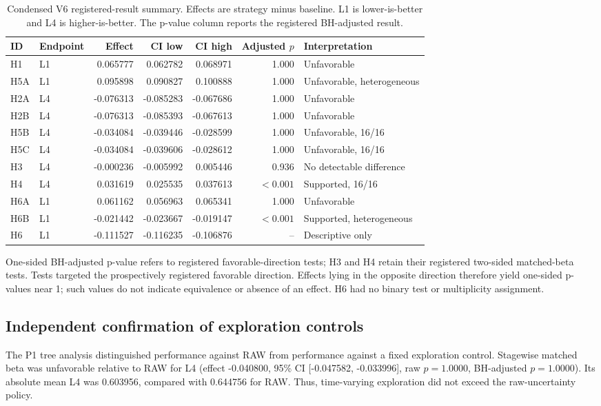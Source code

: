 \documentclass[10pt]{article}
\begin{document}
\begin{table}[!htbp]
\centering
\caption{Condensed V6 registered-result summary. Effects are strategy minus
baseline. L1 is lower-is-better and L4 is higher-is-better. The p-value column
reports the registered BH-adjusted result.}
\label{tab:registered-summary}
\scriptsize
\begin{tabular}{llrrrrl}
\toprule
ID & Endpoint & Effect & CI low & CI high & Adjusted $p$ & Interpretation\\
\midrule
H1  & L1 &  0.065777 &  0.062782 &  0.068971 & 1.000 & Unfavorable\\
H5A & L1 &  0.095898 &  0.090827 &  0.100888 & 1.000 & Unfavorable, heterogeneous\\
H2A & L4 & -0.076313 & -0.085283 & -0.067686 & 1.000 & Unfavorable\\
H2B & L4 & -0.076313 & -0.085393 & -0.067613 & 1.000 & Unfavorable\\
H5B & L4 & -0.034084 & -0.039446 & -0.028599 & 1.000 & Unfavorable, 16/16\\
H5C & L4 & -0.034084 & -0.039606 & -0.028612 & 1.000 & Unfavorable, 16/16\\
H3  & L4 & -0.000236 & -0.005992 &  0.005446 & 0.936 & No detectable difference\\
H4  & L4 &  0.031619 &  0.025535 &  0.037613 & $<0.001$ & Supported, 16/16\\
H6A & L1 &  0.061162 &  0.056963 &  0.065341 & 1.000 & Unfavorable\\
H6B & L1 & -0.021442 & -0.023667 & -0.019147 & $<0.001$ & Supported, heterogeneous\\
H6  & L1 & -0.111527 & -0.116235 & -0.106876 & -- & Descriptive only\\
\bottomrule
\end{tabular}
\begin{minipage}{.98\linewidth}\footnotesize\smallskip
One-sided BH-adjusted p-value refers to registered favorable-direction tests;
H3 and H4 retain their registered two-sided matched-beta tests. Tests targeted
the prospectively registered favorable direction. Effects lying in the
opposite direction therefore yield one-sided p-values near 1; such values do
not indicate equivalence or absence of an effect. H6 had no binary test or
multiplicity assignment.
\end{minipage}
\end{table}



\subsection{Independent confirmation of exploration controls}
The P1 tree analysis distinguished performance against RAW from performance against a fixed exploration control. Stagewise matched beta was unfavorable relative to RAW for L4 (effect -0.040800, 95\% CI [-0.047582, -0.033996], raw $p=1.0000$, BH-adjusted $p=1.0000$). Its absolute mean L4 was 0.603956, compared with 0.644756 for RAW. Thus, time-varying exploration did not exceed the raw-uncertainty policy.
\end{document}
